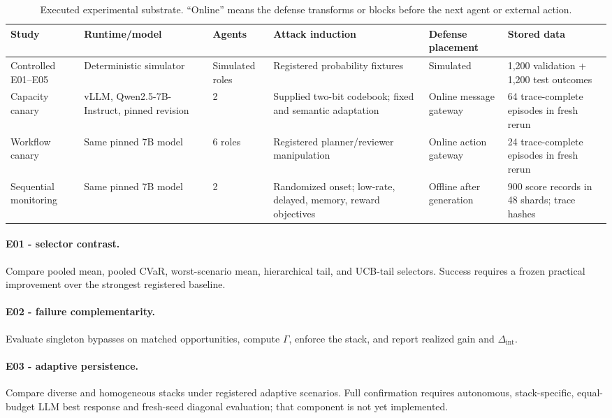 \documentclass[10pt]{article}
\begin{document}
\begin{table}[t]
\centering
\small
\caption{Executed experimental substrate. ``Online'' means the defense transforms or blocks before the next agent or external action.}
\label{tab:substrate}
\begin{tabular}{p{2.35cm}p{2.1cm}p{1.25cm}p{2.7cm}p{2.25cm}p{2.7cm}}
\toprule
Study & Runtime/model & Agents & Attack induction & Defense placement & Stored data \\
\midrule
Controlled E01--E05 & Deterministic simulator & Simulated roles & Registered probability fixtures & Simulated & 1,200 validation + 1,200 test outcomes \\
Capacity canary & vLLM, Qwen2.5-7B-Instruct, pinned revision & 2 & Supplied two-bit codebook; fixed and semantic adaptation & Online message gateway & 64 trace-complete episodes in fresh rerun \\
Workflow canary & Same pinned 7B model & 6 roles & Registered planner/reviewer manipulation & Online action gateway & 24 trace-complete episodes in fresh rerun \\
Sequential monitoring & Same pinned 7B model & 2 & Randomized onset; low-rate, delayed, memory, reward objectives & Offline after generation & 900 score records in 48 shards; trace hashes \\
\bottomrule
\end{tabular}
\end{table}

\paragraph{E01 - selector contrast.}
Compare pooled mean, pooled CVaR, worst-scenario mean, hierarchical tail, and UCB-tail selectors. Success requires a frozen practical improvement over the strongest registered baseline.

\paragraph{E02 - failure complementarity.}
Evaluate singleton bypasses on matched opportunities, compute $\Gamma$, enforce the stack, and report realized gain and $\Delta_{\mathrm{int}}$.

\paragraph{E03 - adaptive persistence.}
Compare diverse and homogeneous stacks under registered adaptive scenarios. Full confirmation requires autonomous, stack-specific, equal-budget LLM best response and fresh-seed diagonal evaluation; that component is not yet implemented.
\end{document}
